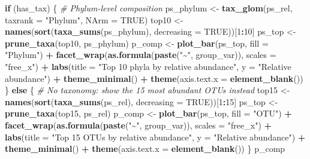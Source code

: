 \documentclass[
]{article}
\newenvironment{Shaded}{\begin{snugshade}}{\end{snugshade}}
\newcommand{\AttributeTok}[1]{\textcolor[rgb]{0.13,0.29,0.53}{#1}}
\newcommand{\CommentTok}[1]{\textcolor[rgb]{0.56,0.35,0.01}{\textit{#1}}}
\newcommand{\ConstantTok}[1]{\textcolor[rgb]{0.56,0.35,0.01}{#1}}
\newcommand{\ControlFlowTok}[1]{\textcolor[rgb]{0.13,0.29,0.53}{\textbf{#1}}}
\newcommand{\DecValTok}[1]{\textcolor[rgb]{0.00,0.00,0.81}{#1}}
\newcommand{\FunctionTok}[1]{\textcolor[rgb]{0.13,0.29,0.53}{\textbf{#1}}}
\newcommand{\NormalTok}[1]{#1}
\newcommand{\OtherTok}[1]{\textcolor[rgb]{0.56,0.35,0.01}{#1}}
\newcommand{\SpecialCharTok}[1]{\textcolor[rgb]{0.81,0.36,0.00}{\textbf{#1}}}
\newcommand{\StringTok}[1]{\textcolor[rgb]{0.31,0.60,0.02}{#1}}
\begin{document}
\begin{Shaded}
\begin{Highlighting}[]
\ControlFlowTok{if}\NormalTok{ (has\_tax) \{}
  \CommentTok{\# Phylum{-}level composition}
\NormalTok{  ps\_phylum }\OtherTok{\textless{}{-}} \FunctionTok{tax\_glom}\NormalTok{(ps\_rel, }\AttributeTok{taxrank =} \StringTok{"Phylum"}\NormalTok{, }\AttributeTok{NArm =} \ConstantTok{TRUE}\NormalTok{)}
\NormalTok{  top10 }\OtherTok{\textless{}{-}} \FunctionTok{names}\NormalTok{(}\FunctionTok{sort}\NormalTok{(}\FunctionTok{taxa\_sums}\NormalTok{(ps\_phylum), }\AttributeTok{decreasing =} \ConstantTok{TRUE}\NormalTok{))[}\DecValTok{1}\SpecialCharTok{:}\DecValTok{10}\NormalTok{]}
\NormalTok{  ps\_top }\OtherTok{\textless{}{-}} \FunctionTok{prune\_taxa}\NormalTok{(top10, ps\_phylum)}
\NormalTok{  p\_comp }\OtherTok{\textless{}{-}} \FunctionTok{plot\_bar}\NormalTok{(ps\_top, }\AttributeTok{fill =} \StringTok{"Phylum"}\NormalTok{) }\SpecialCharTok{+}
    \FunctionTok{facet\_wrap}\NormalTok{(}\FunctionTok{as.formula}\NormalTok{(}\FunctionTok{paste}\NormalTok{(}\StringTok{"\textasciitilde{}"}\NormalTok{, group\_var)), }\AttributeTok{scales =} \StringTok{"free\_x"}\NormalTok{) }\SpecialCharTok{+}
    \FunctionTok{labs}\NormalTok{(}\AttributeTok{title =} \StringTok{"Top 10 phyla by relative abundance"}\NormalTok{, }\AttributeTok{y =} \StringTok{"Relative abundance"}\NormalTok{) }\SpecialCharTok{+}
    \FunctionTok{theme\_minimal}\NormalTok{() }\SpecialCharTok{+} \FunctionTok{theme}\NormalTok{(}\AttributeTok{axis.text.x =} \FunctionTok{element\_blank}\NormalTok{())}
\NormalTok{\} }\ControlFlowTok{else}\NormalTok{ \{}
  \CommentTok{\# No taxonomy: show the 15 most abundant OTUs instead}
\NormalTok{  top15 }\OtherTok{\textless{}{-}} \FunctionTok{names}\NormalTok{(}\FunctionTok{sort}\NormalTok{(}\FunctionTok{taxa\_sums}\NormalTok{(ps\_rel), }\AttributeTok{decreasing =} \ConstantTok{TRUE}\NormalTok{))[}\DecValTok{1}\SpecialCharTok{:}\DecValTok{15}\NormalTok{]}
\NormalTok{  ps\_top }\OtherTok{\textless{}{-}} \FunctionTok{prune\_taxa}\NormalTok{(top15, ps\_rel)}
\NormalTok{  p\_comp }\OtherTok{\textless{}{-}} \FunctionTok{plot\_bar}\NormalTok{(ps\_top, }\AttributeTok{fill =} \StringTok{"OTU"}\NormalTok{) }\SpecialCharTok{+}
    \FunctionTok{facet\_wrap}\NormalTok{(}\FunctionTok{as.formula}\NormalTok{(}\FunctionTok{paste}\NormalTok{(}\StringTok{"\textasciitilde{}"}\NormalTok{, group\_var)), }\AttributeTok{scales =} \StringTok{"free\_x"}\NormalTok{) }\SpecialCharTok{+}
    \FunctionTok{labs}\NormalTok{(}\AttributeTok{title =} \StringTok{"Top 15 OTUs by relative abundance"}\NormalTok{, }\AttributeTok{y =} \StringTok{"Relative abundance"}\NormalTok{) }\SpecialCharTok{+}
    \FunctionTok{theme\_minimal}\NormalTok{() }\SpecialCharTok{+} \FunctionTok{theme}\NormalTok{(}\AttributeTok{axis.text.x =} \FunctionTok{element\_blank}\NormalTok{())}
\NormalTok{\}}
\NormalTok{p\_comp}
\end{Highlighting}
\end{Shaded}
\end{document}
